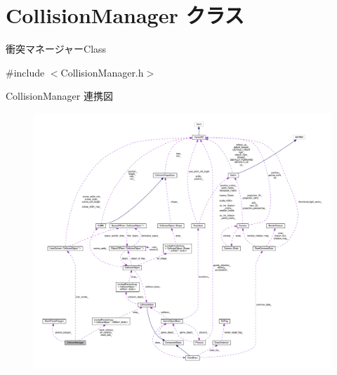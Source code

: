\hypertarget{class_collision_manager}{}\section{Collision\+Manager クラス}
\label{class_collision_manager}


衝突マネージャー\+Class  




{\ttfamily \#include $<$Collision\+Manager.\+h$>$}



Collision\+Manager 連携図\nopagebreak
\begin{figure}[H]
\begin{center}
\leavevmode
\includegraphics[width=350pt]{class_collision_manager__coll__graph}
\end{center}
\end{figure}
